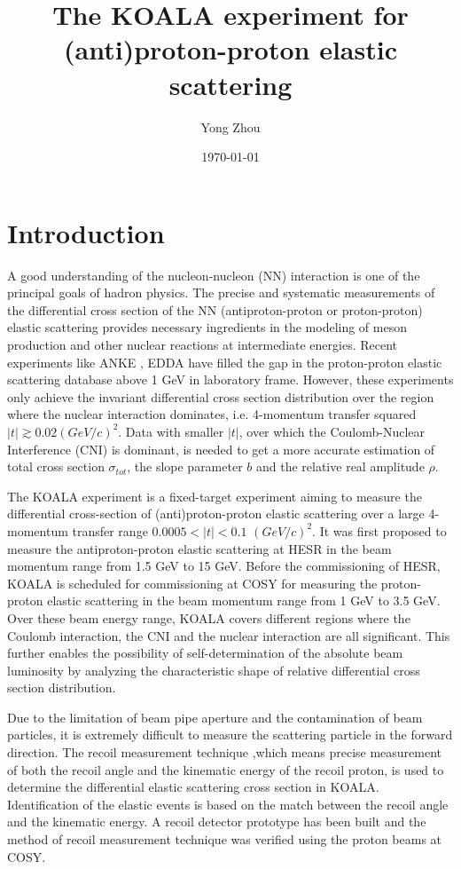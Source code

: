 \documentclass[number]{elsarticle}
\author{Yong Zhou}
\date{\today}
\title{The KOALA experiment for (anti)proton-proton elastic scattering}
\begin{document}
\maketitle

\tableofcontents

\section{Introduction}
\label{sec:introduction}

A good understanding of the nucleon-nucleon (NN) interaction is one of the principal goals of hadron physics.
The precise and systematic measurements of the differential cross section of the NN (antiproton-proton or proton-proton) elastic scattering provides necessary ingredients
in the modeling of meson production and other nuclear reactions at intermediate energies.
Recent experiments like ANKE \cite{ANKE}, EDDA \cite{EDDA} have filled the gap in the proton-proton elastic scattering database above 1 GeV in laboratory frame.
However, these experiments only achieve the invariant differential cross section distribution over the region where the nuclear interaction dominates, 
i.e. 4-momentum transfer squared \(|t| \gtrsim 0.02 (GeV/c)^2\).
Data with smaller \(|t|\), over which the Coulomb-Nuclear Interference (CNI) is dominant, is needed to get a more accurate estimation of total cross section \({\sigma}_{tot}\), the slope parameter \(b\) and the relative real amplitude \(\rho\).

The KOALA experiment is a fixed-target experiment aiming to measure the differential cross-section of (anti)proton-proton elastic scattering 
over a large 4-momentum transfer range \(0.0005 < |t| < 0.1\) \((GeV/c)^2\).
It was first proposed to measure the antiproton-proton elastic scattering at HESR in the beam momentum range from 1.5 GeV to 15 GeV.
Before the commissioning of HESR, KOALA is scheduled for commissioning at COSY for measuring the proton-proton elastic scattering in the beam momentum range from 1 GeV to 3.5 GeV.
Over these beam energy range, KOALA covers different regions where the Coulomb interaction, the CNI and the nuclear interaction are all significant.
This further enables the possibility of self-determination of the absolute beam luminosity by analyzing the characteristic shape of relative differential cross section distribution.

Due to the limitation of beam pipe aperture and the contamination of beam particles,
it is extremely difficult to measure the scattering particle in the forward direction.
The recoil measurement technique ,which means precise measurement of  both the recoil angle and the kinematic energy of the recoil proton, 
is used to determine the differential elastic scattering cross section in KOALA.
Identification of the elastic events is based on the match between the recoil angle and the kinematic energy.
A recoil detector prototype has been built and the method of recoil measurement technique was verified using the proton beams at COSY.
\end{document}
